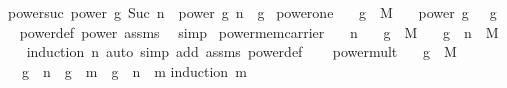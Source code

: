 \begin{isabellebody}
{\isacharbar}{\kern0pt}\ power{\isacharunderscore}{\kern0pt}suc{\isacharcolon}{\kern0pt}\ {\isachardoublequoteopen}power\ g\ {\isacharparenleft}{\kern0pt}Suc\ n{\isacharparenright}{\kern0pt}\ {\isacharequal}{\kern0pt}\ power\ g\ n\ {\isasymcdot}\ g{\isachardoublequoteclose}\isanewline
\isanewline
{}\isamarkupfalse%
\ power{\isacharunderscore}{\kern0pt}one{\isacharcolon}{\kern0pt}\isanewline
\ \ \ {\isachardoublequoteopen}g\ {\isasymin}\ M{\isachardoublequoteclose}\isanewline
\ \ \ {\isachardoublequoteopen}power\ g\ {}\ {\isacharequal}{\kern0pt}\ g{\isachardoublequoteclose}%
\isadelimproof
\ %
\endisadelimproof
%
\isatagproof
{}\isamarkupfalse%
\ power{\isacharunderscore}{\kern0pt}def\ power{}\ assms\ \isamarkupfalse%
\ simp%
\endisatagproof
{\isafoldproof}%
%
\isadelimproof
%
\endisadelimproof
\isanewline
\isanewline
{}\isamarkupfalse%
\ power{\isacharunderscore}{\kern0pt}mem{\isacharunderscore}{\kern0pt}carrier{\isacharcolon}{\kern0pt}\isanewline
\ \ \ n\isanewline
\ \ \ {\isachardoublequoteopen}g\ {\isasymin}\ M{\isachardoublequoteclose}\isanewline
\ \ \ {\isachardoublequoteopen}g\ {\isacharcircum}{\kern0pt}\ n\ {\isasymin}\ M{\isachardoublequoteclose}\isanewline
%
\isadelimproof
\ \ %
\endisadelimproof
%
\isatagproof
{}\isamarkupfalse%
\ {\isacharparenleft}{\kern0pt}induction\ n{\isacharcomma}{\kern0pt}\ auto\ simp\ add{\isacharcolon}{\kern0pt}\ assms\ power{\isacharunderscore}{\kern0pt}def{\isacharparenright}{\kern0pt}\isanewline
\ \ \isamarkupfalse%
%
\endisatagproof
{\isafoldproof}%
%
\isadelimproof
\isanewline
%
\endisadelimproof
\isanewline
{}\isamarkupfalse%
\ power{\isacharunderscore}{\kern0pt}mult{\isacharcolon}{\kern0pt}\isanewline
\ \ \ {\isachardoublequoteopen}g\ {\isasymin}\ M{\isachardoublequoteclose}\isanewline
\ \ \ {\isachardoublequoteopen}g\ {\isacharcircum}{\kern0pt}\ n\ {\isasymcdot}\ g\ {\isacharcircum}{\kern0pt}\ m\ {\isacharequal}{\kern0pt}\ g\ {\isacharcircum}{\kern0pt}\ {\isacharparenleft}{\kern0pt}n\ {\isacharplus}{\kern0pt}\ m{\isacharparenright}{\kern0pt}{\isachardoublequoteclose}\isanewline
%
\isadelimproof
%
\endisadelimproof
%
\isatagproof
{}\isamarkupfalse%
{\isacharparenleft}{\kern0pt}induction\ m{\isacharparenright}{\kern0pt}\isanewline
\ \ \isamarkupfalse%
\ {}\isanewline
\ \ \isamarkupfalse%
\ \isamarkupfalse%

\end{isabellebody}
